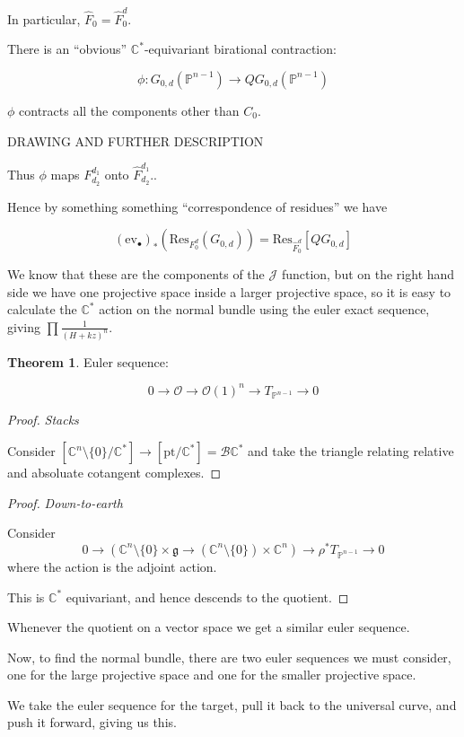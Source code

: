 \documentclass{amsart}
\theoremstyle{definition}
\newtheorem{theorem}[dummy]{Theorem}
\newcommand{\OO}{\mathcal{O}}
\newcommand{\proj}{\mathbb{P}}
\newcommand{\J}{\mathcal{J}}
\newcommand{\C}{\mathbb{C}}
\newcommand{\ev}{\text{ev}}
\begin{document}
In particular, $\hat{F}_0=\hat{F}^d_0$.

There is an ``obvious'' $\C^*$-equivariant birational contraction:

$$\phi:G_{0,d}(\proj^{n-1})\to QG_{0,d}(\proj^{n-1})$$

$\phi$ contracts all the components other than $C_0$.

DRAWING AND FURTHER DESCRIPTION

Thus $\phi$ maps $F^{d_1}_{d_2}$ onto $\hat{F}^{d_1}_{d_2}$..

Hence by something something ``correspondence of residues'' we have

$$(\ev_\bullet)_*\left(\text{Res}_{F_0^d}(G_{0,d})\right)=\text{Res}_{\hat{F}_0^d}[QG_{0,d}]$$

We know that these are the components of the $\J$ function, but on the right hand side we have one projective space inside a larger projective space, so it is easy to calculate the $\C^*$ action on the normal bundle using the euler exact sequence, giving $\prod\frac{1}{(H+kz)^n}$.


\begin{theorem}
Euler sequence:

$$0\to\OO\to\OO(1)^n\to T_{\proj^{n-1}}\to 0$$
\end{theorem}

\begin{proof}
\emph{Stacks}

Consider $[\C^n\setminus\{0\}/\C^*]\to[\text{pt}/\C^*]=\mathcal{B}\C^*$
and take the triangle relating relative and absoluate cotangent complexes.
\end{proof}

\begin{proof}
\emph{Down-to-earth}

Consider 
$$0\to(\C^n\setminus\{0\}\times\mathfrak{g}\to(\C^n\setminus\{0\})\times\C^n)\to\rho^*T_{\proj^{n-1}}\to 0$$
where the action is the adjoint action.

This is $\C^*$ equivariant, and hence descends to the quotient.
\end{proof}

Whenever the quotient on a vector space we get a similar euler sequence.


Now, to find the normal bundle, there are two euler sequences we must consider, one for the large projective space and one for the smaller projective space.

We take the euler sequence for the target, pull it back to the universal curve, and push it forward, giving us this.
\end{document}
